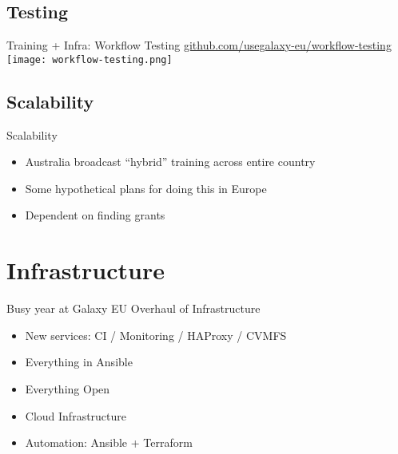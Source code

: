 \documentclass[12pt]{euslides}
\begin{document}
{%
	\begin{frame}[plain]
	\end{frame}
}

{%
	\begin{frame}[plain]
	\end{frame}
}

\subsection{Testing}
\begin{frame}{Training + Infra: Workflow Testing}
	\url{github.com/usegalaxy-eu/workflow-testing}\ \\
\texttt{[image: workflow-testing.png]}
\end{frame}

\subsection{Scalability}
\begin{frame}{Scalability}
	\begin{itemize}
		\item Australia broadcast ``hybrid'' training across entire country
		\item Some hypothetical plans for doing this in Europe
		\item Dependent on finding grants
	\end{itemize}
\end{frame}

\section{Infrastructure}
\begin{frame}{Busy year at Galaxy EU}
	Overhaul of Infrastructure
	\begin{itemize}
		\item New services: CI / Monitoring / HAProxy / CVMFS
		\item Everything in Ansible
		\item Everything Open
		\item Cloud Infrastructure
		\item Automation: Ansible + Terraform
	\end{itemize}
\end{frame}
\end{document}
